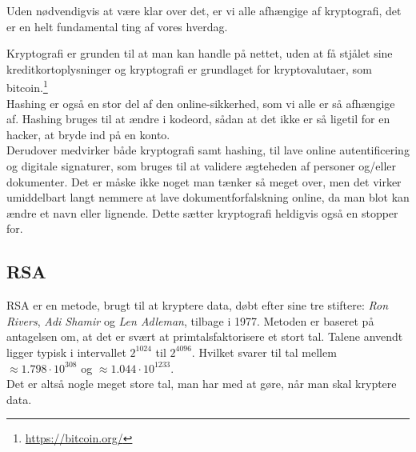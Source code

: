 Uden nødvendigvis at være klar over det, er vi alle afhængige af kryptografi, det er en helt fundamental ting af vores hverdag.

Kryptografi er grunden til at man kan handle på nettet, uden at få stjålet sine kreditkortoplysninger og
kryptografi er grundlaget for kryptovalutaer, som bitcoin.\footnote{\url{https://bitcoin.org/}} \\
Hashing er også en stor del af den online-sikkerhed, som vi alle er så afhængige af.
Hashing bruges til at ændre i kodeord, sådan at det ikke er så ligetil for en hacker, at bryde ind på en konto.\\
Derudover medvirker både kryptografi samt hashing, til lave online autentificering og digitale signaturer, som bruges til at validere ægteheden af personer og/eller dokumenter.
Det er måske ikke noget man tænker så meget over, men det virker umiddelbart langt nemmere at lave dokumentforfalskning online, da man blot kan ændre et navn eller lignende. Dette sætter kryptografi heldigvis også en stopper for.



\subsection*{RSA}
RSA er en metode, brugt til at kryptere data, døbt efter sine tre stiftere:
\textit{Ron Rivers}, \textit{Adi Shamir} og \textit{Len Adleman}, tilbage i 1977.\cite{algoritmer}
Metoden er baseret på antagelsen om, at det er svært at primtalsfaktorisere et stort tal.
Talene anvendt ligger typisk i intervallet \(2^{1024}\) til \(2^{4096}\).
Hvilket svarer til tal mellem \(\approx 1.798 \cdot 10^{308}\) og \(\approx 1.044 \cdot 10^{1233}\).\\ %
Det er altså nogle meget store tal, man har med at gøre, når man skal kryptere data.
